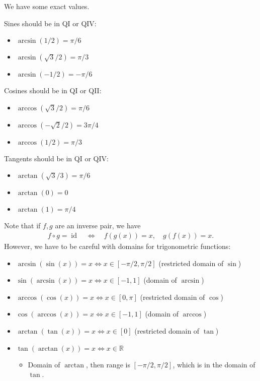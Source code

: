 \begin{example}[?]

We have some exact values.

Sines should be in QI or QIV:

\begin{itemize}
\tightlist
\item
  \(\arcsin(1/2) = \pi/6\)
\item
  \(\arcsin(\sqrt{3}/2) = \pi/3\)
\item
  \(\arcsin(-1/2) = -\pi/6\)
\end{itemize}

Cosines should be in QI or QII:

\begin{itemize}
\tightlist
\item
  \(\arccos(\sqrt{3}/2) = \pi/6\)
\item
  \(\arccos(-\sqrt{2}/2) = 3\pi/4\)
\item
  \(\arccos(1/2) = \pi/3\)
\end{itemize}

Tangents should be in QI or QIV:

\begin{itemize}
\tightlist
\item
  \(\arctan(\sqrt{3}/3) = \pi/6\)
\item
  \(\arctan(0) = 0\)
\item
  \(\arctan(1) = \pi/4\)
\end{itemize}

\end{example}

\begin{warnings}

Note that if \(f, g\) are an inverse pair, we have
\begin{align*}
f\circ g = \operatorname{id}\quad\iff\quad f(g(x)) = x,\quad g(f(x)) = x
.\end{align*}
However, we have to be careful with domains for trigonometric functions:

\begin{itemize}
\tightlist
\item
  \(\arcsin(\sin(x)) = x \iff x\in [-\pi/2, \pi/2]\) (restricted domain
  of \(\sin\))
\item
  \(\sin(\arcsin(x)) = x \iff x\in [-1, 1]\) (domain of \(\arcsin\))
\item
  \(\arccos(\cos(x)) = x \iff x\in [0, \pi]\) (restricted domain of
  \(\cos\))
\item
  \(\cos(\arccos(x)) = x \iff x\in [-1, 1]\) (domain of \(\arccos\))
\item
  \(\arctan(\tan(x)) = x \iff x\in [0]\) (restricted domain of \(\tan\))
\item
  \(\tan(\arctan(x)) = x \iff x\in {\mathbb{R}}\)

  \begin{itemize}
  \tightlist
  \item
    Domain of \(\arctan\), then range is \([-\pi/2, \pi/2]\), which is
    in the domain of \(\tan\).
  \end{itemize}
\end{itemize}

\end{warnings}

